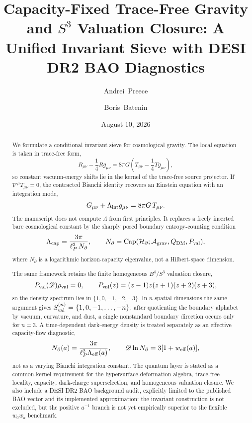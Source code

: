 \documentclass[aps,prd,reprint,nofootinbib,superscriptaddress]{revtex4-2}
\numberwithin{equation}{section}
\theoremstyle{definition}
\theoremstyle{plain}
\newcommand{\Dil}{\mathscr D}
\newcommand{\Agrav}{\mathcal A_{\rm grav}}
\newcommand{\Ncap}{N_{\partial}}
\newcommand{\Capacity}{\operatorname{Cap}}
\begin{document}
\title{Capacity-Fixed Trace-Free Gravity and \texorpdfstring{$S^3$}{S3} Valuation Closure: A Unified Invariant Sieve with DESI DR2 BAO Diagnostics}

\author{Andrei~Preece}

\author{Boris~Batenin}

\date{August 10, 2026}

\begin{abstract}
We formulate a conditional invariant sieve for cosmological gravity.  The local equation is taken in trace-free form,
\[
R_{\mu\nu}-\frac14Rg_{\mu\nu}
=
8\pi G\left(T_{\mu\nu}-\frac14Tg_{\mu\nu}\right),
\]
so constant vacuum-energy shifts lie in the kernel of the trace-free source projector.  If \(\nabla^\mu T_{\mu\nu}=0\), the contracted Bianchi identity recovers an Einstein equation with an integration mode,
\[
G_{\mu\nu}+\Lambda_{\rm int}g_{\mu\nu}=8\pi G\,T_{\mu\nu}.
\]
The manuscript does not compute \(\Lambda\) from first principles.  It replaces a freely inserted bare cosmological constant by the sharply posed boundary entropy-counting condition
\[
\Lambda_{\rm cap}
=
\frac{3\pi}{\ell_P^2\,\Ncap},
\qquad
\Ncap=\Capacity(\mathcal H_{\partial};\Agrav,Q_{\rm DM},P_{\rm val}),
\]
where \(\Ncap\) is a logarithmic horizon-capacity eigenvalue, not a Hilbert-space dimension.

The same framework retains the finite homogeneous \(B^4/S^3\) valuation closure,
\[
P_{\rm val}(\Dil)\rho_{\rm val}=0,\qquad
P_{\rm val}(z)=(z-1)z(z+1)(z+2)(z+3),
\]
so the density spectrum lies in \(\{1,0,-1,-2,-3\}\).  In \(n\) spatial dimensions the same argument gives \(S_{\rm val}^{(n)}=\{1,0,-1,\ldots,-n\}\); after quotienting the boundary alphabet by vacuum, curvature, and dust, a single nonstandard boundary direction occurs only for \(n=3\).  A time-dependent dark-energy density is treated separately as an effective capacity-flow diagnostic,
\[
N_\partial(a)=\frac{3\pi}{\ell_P^2\Lambda_{\rm eff}(a)},
\qquad
\Dil\ln N_\partial=3[1+w_{\rm eff}(a)],
\]
not as a varying Bianchi integration constant.  The quantum layer is stated as a common-kernel requirement for the hypersurface-deformation algebra, trace-free locality, capacity, dark-charge superselection, and homogeneous valuation closure.  We also include a DESI DR2 BAO background audit, explicitly limited to the published BAO vector and its implemented approximation: the invariant construction is not excluded, but the positive \(a^{-1}\) branch is not yet empirically superior to the flexible \(w_0w_a\) benchmark.
\end{abstract}
\end{document}
